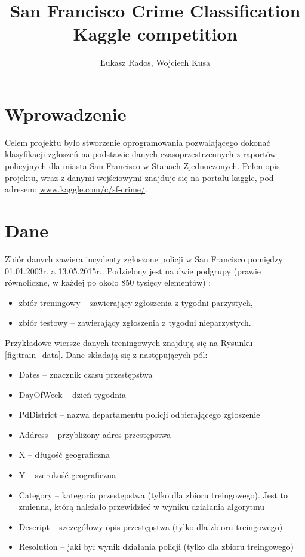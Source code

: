 \documentclass[11pt]{article} %
\title{San Francisco Crime Classification\\ \large{Kaggle competition  }}
\author{Łukasz Rados, Wojciech Kusa}
\affil{Wydział Fizyki i Informatyki Stosowanej \\ Akademia Górniczo-Hutnicza w Krakowie}
\begin{document}
\maketitle

\section{Wprowadzenie}

Celem projektu było stworzenie oprogramowania pozwalającego dokonać klasyfikacji zgłoszeń na podstawie danych czasoprzestrzennych z raportów policyjnych dla miasta San Francisco w Stanach Zjednoczonych. Pełen opis projektu, wraz z danymi wejściowymi znajduje się na portalu kaggle, pod adresem: \url{www.kaggle.com/c/sf-crime/}.


\section{Dane} \label{sec:data}

Zbiór danych zawiera incydenty zgłoszone policji w San Francisco pomiędzy 01.01.2003r. a 13.05.2015r.. Podzielony jest na dwie podgrupy (prawie równoliczne, w każdej po około 850 tysięcy elementów) :
\begin{itemize}
\item zbiór treningowy -- zawierający zgłoszenia z tygodni parzystych,

\item zbiór testowy --  zawierający zgłoszenia z tygodni nieparzystych.
\end{itemize} 

Przykładowe wiersze danych treningowych znajdują się na Rysunku \ref{fig:train_data}. Dane składają się z następujących pól:

\begin{itemize}
\item Dates -- znacznik czasu przestępstwa
\item DayOfWeek -- dzień tygodnia
\item PdDistrict -- nazwa departamentu policji odbierającego zgłoszenie
\item Address -- przybliżony adres przestępstwa
\item X -- długość geograficzna
\item Y -- szerokość geograficzna
\item Category -- kategoria przestępstwa (tylko dla zbioru treingowego). Jest to zmienna, którą należało przewidzieć w wyniku działania algorytmu
\item Descript -- szczegółowy opis przestępstwa (tylko dla zbioru treingowego)
\item Resolution -- jaki był wynik działania policji (tylko dla zbioru treingowego)

\end{itemize}
\end{document}

